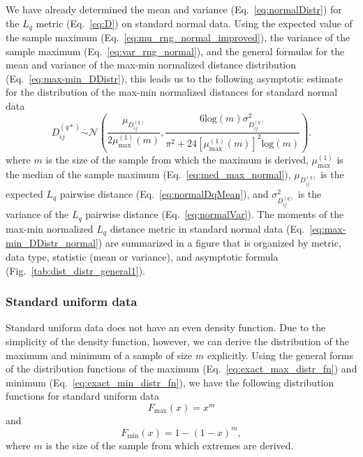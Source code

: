 \documentclass[10pt,letterpaper]{article}
\begin{document}
We have already determined the mean and variance (Eq.~\ref{eq:normalDistr}) for the $L_q$ metric (Eq.~\ref{eq:D}) on standard normal data. Using the expected value of the sample maximum (Eq.~\ref{eq:mu_rng_normal_improved}), the variance of the sample maximum (Eq.~\ref{eq:var_rng_normal}), and the general formulas for the mean and variance of the max-min normalized distance distribution (Eq.~\ref{eq:max-min_DDistr}), this leads us to the following asymptotic estimate for the distribution of the max-min normalized distances for standard normal data
%
\begin{equation}\label{eq:max-min_DDistr_normal}
D^{(q*)}_{ij} \overset{.}{\sim} \mathcal{N}\left(\frac{\mu_{D^{(q)}_{ij}}}{2\mu^{(1)}_\text{max}(m)}, \frac{6 \text{log}(m) \sigma^2_{D^{(q)}_{ij}}}{\pi^2 + 24 \left[\mu^{(1)}_\text{max}(m)\right]^2 \text{log}(m)}\right).
\end{equation}
%
where $m$ is the size of the sample from which the maximum is derived, $\mu^{(1)}_\text{max}$ is the median of the sample maximum (Eq.~\ref{eq:med_max_normal}), $\mu_{D^{(q)}_{ij}}$ is the expected $L_q$ pairwise distance (Eq.~\ref{eq:normalDqMean}), and $\sigma^2_{D^{(q)}_{ij}}$ is the variance of the $L_q$ pairwise distance (Eq.~\ref{eq:normalVar}). The moments of the max-min normalized $L_q$ distance metric in standard normal data (Eq.~\ref{eq:max-min_DDistr_normal}) are summarized in a figure that is organized by metric, data type, statistic (mean or variance), and asymptotic formula (Fig.~\ref{tab:dist_distr_general1}).

\subsubsection*{Standard uniform data}

Standard uniform data does not have an even density function. Due to the simplicity of the density function, however, we can derive the distribution of the maximum and minimum of a sample of size $m$ explicitly. Using the general forms of the distribution functions of the maximum (Eq.~\ref{eq:exact_max_distr_fn}) and minimum (Eq.~\ref{eq:exact_min_distr_fn}), we have the following distribution functions for standard uniform data
%
\begin{equation}\label{eq:uniform_max_distr}
F_\text{max}(x) = x^m
\end{equation}
%
and
%
\begin{equation}\label{eq:uniform_min_distr}
F_\text{min}(x) = 1 - (1 - x)^m,
\end{equation}
%
where $m$ is the size of the sample from which extremes are derived.
\end{document}
